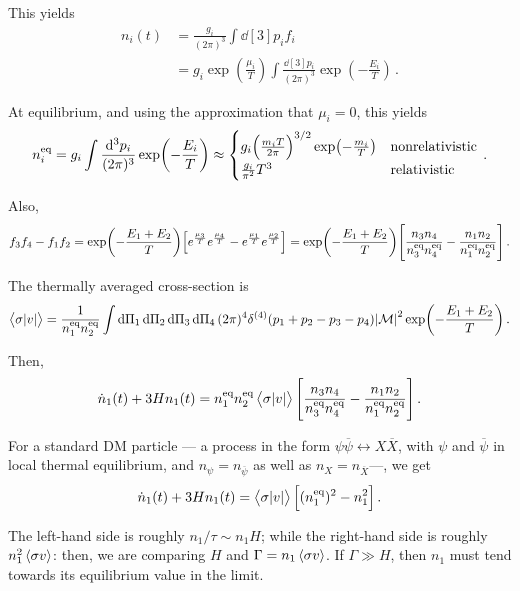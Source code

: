 \documentclass[main.tex]{subfiles}
\begin{document}
This yields 
%
\begin{align}
n_i (t) &= \frac{g_i}{(2 \pi )^3} \int \dd[3]{p_i} f_i  \\
&= g_i \exp( \frac{\mu_i}{T}) \int \frac{ \dd[3]{p_i}}{(2 \pi )^3} 
\exp(- \frac{E_i}{T})
\,.
\end{align}

At equilibrium, and using the approximation that \(\mu _i = 0\), this yields 
%
\begin{align} \label{eq:equilibrium-number-density}
n^{\text{eq}}_i = 
g_i \int \frac{ \dd[3]{p_i}}{(2 \pi )^3} 
\exp(- \frac{E_i}{T}) \approx \begin{cases}
    g_i \qty(\frac{m_i T}{2 \pi })^{3/2} \exp(- \frac{m_i}{T}) & \text{nonrelativistic}  \\
    \frac{g_i}{\pi^2} T^3 & \text{relativistic}
\end{cases}
\,.
\end{align}

Also, 
%
\begin{align}
f_3 f_4 - f_1 f_2 = \exp(- \frac{E_1 + E_2 }{T}) 
\qty[ e^{ \frac{\mu_3}{T}} e^{ \frac{\mu_4}{T}} - e^{ \frac{\mu_1}{T}} e^{ \frac{\mu_2}{T}} ] 
= \exp(- \frac{E_1 + E_2 }{T}) \qty[
    \frac{n_3 n_4 }{n_3^{\text{eq}} n_4^{\text{eq}}} -
    \frac{n_1 n_2 }{n_1^{\text{eq}} n_2^{\text{eq}}}
]
\,.
\end{align}

The thermally averaged cross-section is 
%
\begin{align}
\expval{\sigma \abs{v}} = 
\frac{1}{n_1^{\text{eq}} n_2^{\text{eq}}}
\int \dd{\Pi_1 }\dd{\Pi_2}\dd{\Pi_3 }\dd{\Pi_4 }
(2 \pi )^{4} \delta^{(4)} (p_1 + p_2 - p_3 - p_4 )
\abs{\mathcal{M}}^2 \exp(- \frac{E_1 + E_2 }{T})
\,.
\end{align}

Then, 
%
\begin{align}
\dot{n}_1(t) + 3 H n_1 (t) = n_1^{\text{eq}} n_2^{\text{eq}}
\expval{\sigma \abs{v}}
\qty[
    \frac{n_3 n_4 }{n_3^{\text{eq}} n_4^{\text{eq}}} -
    \frac{n_1 n_2 }{n_1^{\text{eq}} n_2^{\text{eq}}}
]
\,.
\end{align}

For a standard DM particle --- a process in the form \(\psi \overline{\psi} \leftrightarrow X \overline{X}\), with \(\psi \) and \(\overline{\psi }\) in local thermal equilibrium, and \(n_\psi = n_{\overline{\psi}}\) as well as \(n_X = n_{\overline{X}}\)---, we get 
%
\begin{align}
\dot{n}_1 (t) + 3 H n_1 (t) = \expval{\sigma \abs{v}} \qty[ (n_1^{\text{eq}})^2 - n_1^2]
\,.
\end{align}

The left-hand side is roughly \(n_1 / \tau \sim n_1 H\); while the right-hand side is roughly \(n_1^2 \expval{\sigma v}\): then, we are comparing \(H\) and \(\Gamma = n_1 \expval{\sigma v}\). 
If \(\Gamma \gg H\), then \(n_1 \) must tend towards its equilibrium value in the limit. 
\end{document}
